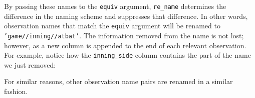 \documentclass[12pt,]{isuthesis}
\newenvironment{Shaded}{\begin{snugshade}}{\end{snugshade}}
\newcommand{\KeywordTok}[1]{\textcolor[rgb]{0.13,0.29,0.53}{\textbf{{#1}}}}
\newcommand{\DecValTok}[1]{\textcolor[rgb]{0.00,0.00,0.81}{{#1}}}
\newcommand{\StringTok}[1]{\textcolor[rgb]{0.31,0.60,0.02}{{#1}}}
\newcommand{\CommentTok}[1]{\textcolor[rgb]{0.56,0.35,0.01}{\textit{{#1}}}}
\newcommand{\NormalTok}[1]{{#1}}
\begin{document}
By passing these names to the \texttt{equiv} argument, \texttt{re\_name}
determines the difference in the naming scheme and suppresses that
difference. In other words, observation names that match the
\texttt{equiv} argument will be renamed to
\texttt{'game//inning//atbat'}. The information removed from the name is
not lost; however, as a new column is appended to the end of each
relevant observation. For example, notice how the \texttt{inning\_side}
column contains the part of the name we just removed:

\begin{Shaded}
\end{Shaded}

For similar reasons, other observation name pairs are renamed in a
similar fashion.
\end{document}
